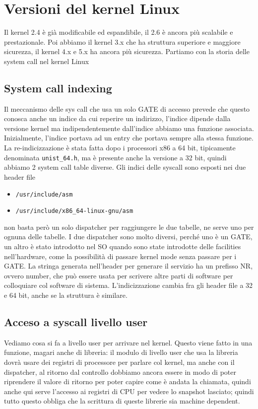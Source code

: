 \documentclass[12pt, oneside]{extbook}
\begin{document}
\section{Versioni del kernel Linux}
Il kernel 2.4 è già modificabile ed espandibile, il 2.6 è ancora più scalabile e prestazionale. Poi abbiamo il kernel 3.x che ha struttura superiore e maggiore sicurezza, il kernel 4.x e 5.x ha ancora più sicurezza. Partiamo con la storia delle system call nel kernel Linux
\subsection{System call indexing}
Il meccanismo delle sys call che usa un solo GATE di accesso prevede che questo conosca anche un indice da cui reperire un indirizzo, l'indice dipende dalla versione kernel ma indipendentemente dall'indice abbiamo una funzione associata.\\ Inizialmente, l'indice portava ad un entry che portava sempre alla stessa funzione. La re-indicizzazione è stata fatta dopo i processori x86 a 64 bit, tipicamente denominata \texttt{unist\_64.h}, ma è presente anche la versione a 32 bit, quindi abbiamo 2 system call table diverse. Gli indici delle syscall sono esposti nei due header file
\begin{itemize}
\item \texttt{/usr/include/asm}
\item \texttt{/usr/include/x86\_64-linux-gnu/asm}
\end{itemize}
non basta però un solo dispatcher per raggiungere le due tabelle, ne serve uno per ognuna delle tabelle. I due dispatcher sono molto diversi, perché uno è un GATE, un altro è stato introdotto nel SO quando sono state introdotte delle facilities nell'hardware, come la possibilità di passare kernel mode senza passare per i GATE. La stringa generata nell'header per generare il servizio ha un prefisso NR, ovvero number, che può essere usata per scrivere altre parti di software per colloquiare col software di sistema. L'indicizzazione cambia fra gli header file a 32 e 64 bit, anche se la struttura è similare.
\subsection{Acceso a syscall livello user}
Vediamo cosa si fa a livello user per arrivare nel kernel. Questo viene fatto in una funzione, magari anche di libreria: il modulo di livello user che usa la libreria dovrà usare dei registri di processore per parlare col kernel, ma anche con il dispatcher, al ritorno dal controllo dobbiamo ancora essere in modo di poter riprendere il valore di ritorno per poter capire come è andata la chiamata, quindi anche qui serve l'accesso ai registri di CPU per vedere lo snapshot lasciato; quindi tutto questo obbliga che la scrittura di queste librerie sia machine dependent.
\end{document}
